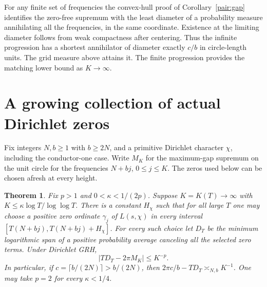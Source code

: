 \documentclass[11pt,letterpaper]{article}
\newtheorem{theorem}{Theorem}[section]
\theoremstyle{remark}\newtheorem{remark}[theorem]{Remark}
\begin{document}
For any finite set of frequencies the convex-hull proof of
Corollary~\ref{pair:gap} identifies the zero-free supremum with the least
diameter of a probability measure annihilating all the frequencies, in
the same coordinate. Existence at the limiting diameter follows from
weak compactness after centering. Thus the infinite progression has a
shortest annihilator of diameter exactly $c/b$ in circle-length units.
The grid measure above attains it. The finite progression provides the
matching lower bound as $K\to\infty$.


\section{A growing collection of actual Dirichlet zeros}
\label{sec:packets}
Fix integers $N,b\ge1$ with $b\ge 2N$, and a primitive Dirichlet character $\chi$, including the conductor-one case. Write $M_K$ for the maximum-gap supremum on the unit circle for the frequencies $N+bj$, $0\le j\le K$. The zeros used below can be chosen afresh at every height.

\begin{theorem}\label{thm:packets}
Fix $p>1$ and $0<\kappa<1/(2p)$. Suppose $K=K(T)\to\infty$ with
$K\le\kappa\log T/\log\log T$. There is a constant $H_\chi$ such that for all large $T$ one may choose a positive zero ordinate $\gamma_j$ of $L(s,\chi)$ in every interval
$[T(N+bj),T(N+bj)+H_\chi]$. For every such choice let $D_T$ be the minimum logarithmic span of a positive probability average canceling all the selected zero terms. Under Dirichlet GRH,
\[
             \bigl|T D_T-2\pi M_K\bigr|\le K^{-p}.
\]
In particular, if $c=\lceil b/(2N)\rceil>b/(2N)$, then
$2\pi c/b-TD_T\asymp_{N,b} K^{-1}$. One may take $p=2$ for every $\kappa<1/4$.
\end{theorem}
\end{document}
